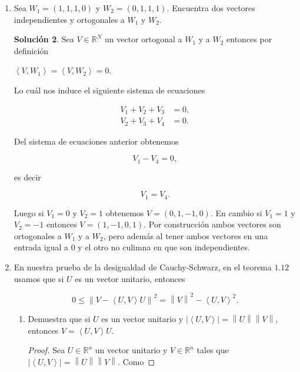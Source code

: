 \documentclass[letterpaper]{article}
\theoremstyle{definition}
\theoremstyle{lemathm}
\theoremstyle{lemathm}
\newtheorem{sol}{Solución}
\theoremstyle{lemathm}
\theoremstyle{lemademthm}
\newcommand{\limtoinf}[1]{\lim_{#1\to\infty}}
\newcommand{\abs}[1]{\left| #1 \right| }
\newcommand{\pars}[1]{\left( #1 \right) }
\newcommand{\inprod}[1]{\left\langle #1 \right\rangle }
\newcommand{\norm}[1]{\left\lVert#1\right\rVert}
\newcommand{\RR}{\mathbb{R}}
\newcommand{\1}{\mathbbm{1}}
\begin{document}
\begin{enumerate}
\begin{enumerate}
			\begin{sol}
				Cómo

				\[\limtoinf{n} \frac{1}{\sqrt{n}} = 0,\]

				entonces si $C$ está en la bola unitaria obtenemos que

				\[\limtoinf{n} c = 0.\]
			\end{sol}
		\end{enumerate}
		\item Sea $W_1 = \pars{1,1,1,0}$ y $W_2 = \pars{0,1,1,1}$. Encuentra dos vectores independientes y ortogonales a $W_1$ y $W_2$.
		
		\begin{sol}
			Sea $V\in \RR^N$ un vector ortogonal a $W_1$ y a $W_2$ entonces por definición

			$\inprod{V,W_1} = \inprod{V,W_2} = 0$.

			Lo cuál nos induce el siguiente sistema de ecuaciones

			\begin{align*}
				V_1 + V_2 + V_3 &= 0,\\
				V_2 + V_3 + V_4 &= 0.
			\end{align*}

			Del sistema de ecuaciones anterior obtenemos

			\[V_1 - V_4 = 0,\]

			es decir

			\[V_1 = V_4.\]

			Luego si $V_1 = 0$ y $V_2 = 1$ obtenemos $V=\pars{0,1,-1,0}$. En cambio si $V_1 = 1$ y $V_2 = -1$ entonces $V = \pars{1,-1,0,1}$. Por construcción ambos vectores son ortogonales a $W_1$ y a $W_2$, pero además al tener ambos vectores en una entrada igual a $0$ y el otro no culimna en que son independientes.
		\end{sol}

		\item En nuestra prueba de la desigualdad de Cauchy-Schwarz, en el teorema $1.12$ usamos que si $U$ es un vector unitario, entonces
		
		\[0\leq \norm{V-\inprod{U,V}U}^2 = \norm{V}^2 - \inprod{U,V}^2.\]

		\begin{enumerate}
			\item Demuestra que si $U$ es un vector unitario y $\abs{\inprod{U,V}} = \norm{U}\norm{V}$, entonces $V = \inprod{U,V}U$.
			\begin{proof}
				Sea $U\in \RR^n$ un vector unitario y $V\in \RR^n$ tales que $\abs{\inprod{U,V}} = \norm{U}\norm{V}$. Como
				

\end{proof}
\end{enumerate}
\end{enumerate}
\end{document}
